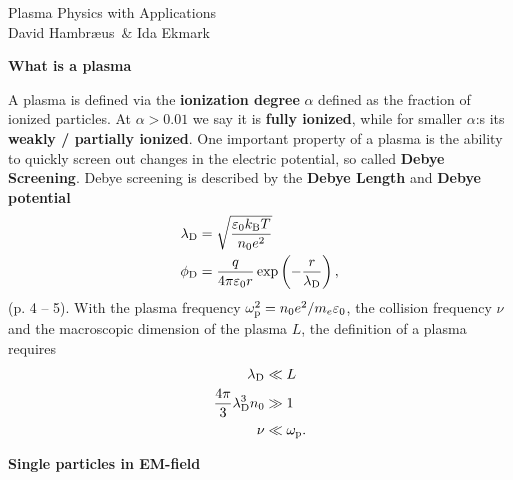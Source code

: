 \documentclass[10pt,landscape]{article}
\newcommand{\topiccolor}{green}
\renewcommand{\section}[2]{%
	\renewcommand{\topiccolor}{#2}
	\begin{tcolorbox}[boxsep=0.5mm, left=1mm, right=1mm, top=0mm, bottom=0mm,
		colback=#2!30, colframe=#2, arc is angular]%
		\centering \textbf{#1}%
	\end{tcolorbox}%
	\nopagebreak%
}
\newcommand{\cbf}[1]{\textcolor{\topiccolor!80!black}{\textbf{#1}}}
\begin{document}
\begin{multicols*}{3}
\begin{tcolorbox}[colframe=black, colback=white]
\centering \large Plasma Physics with Applications\\
\small David Hambr\ae{}us \& Ida Ekmark
\end{tcolorbox}

\section{What is a plasma}{pink}
A plasma is defined via the \cbf{ionization degree} $\alpha$ defined as the
fraction of ionized particles. At $\alpha > 0.01$ we say it is 
\cbf{fully ionized}, while for smaller $\alpha$:s its 
\cbf{weakly / partially ionized}.
One important property of a plasma is the ability to quickly screen out changes
in the electric potential, so called \cbf{Debye Screening}.
Debye screening is described by the \cbf{Debye Length} and \cbf{Debye potential}
\begin{align*}
	\lambda_{\rm D} &= \sqrt{\frac{\varepsilon_0 k_{\rm B} T}{n_0e^2}}\\
	\phi_{\rm D} &= \frac{q}{4\pi\varepsilon_0 r}\exp\left(-\frac{r}{\lambda_{\rm D}}\right),
\end{align*}
(p. 4 -- 5).
With the plasma frequency $\omega_{\rm p}^2=n_0e^2/m_e\varepsilon_0$, the collision frequency $\nu$ and the macroscopic dimension of the plasma $L$, the definition of a plasma requires
\begin{align*}
	\lambda_{\rm D} &\ll L\\
	\frac{4\pi}{3}\lambda_{\rm D}^3n_0 &\gg 1\\
	\nu &\ll \omega_{\rm p}.
\end{align*}

\section{Single particles in EM-field}{orange}


\end{multicols*}
\end{document}

